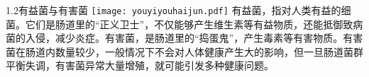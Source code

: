 

\usepackage{graphicx}
\graphicspath{{cores/}}



\vspace*{6mm}
\setlength{\arrayrulewidth}{1pt}
\fontsize{9.3pt}{11pt}\selectfont
\color{gray2}

\begin{spacing}{1.5}
\begin{LRaside}[.8]{1.2有益菌与有害菌}
\noindent
\texttt{[image: youyiyouhaijun.pdf]}
\asidebreak %
有益菌，指对人类有益的细菌。它们是肠道里的“正义卫士”，不仅能够产生维生素等有益物质，还能抵御致病菌的入侵，减少炎症。有害菌，是肠道里的“捣蛋鬼”，产生毒素等有害物质。有害菌在肠道内数量较少，一般情况下不会对人体健康产生大的影响，但一旦肠道菌群平衡失调，有害菌异常大量增殖，就可能引发多种健康问题。
\end{LRaside}
\end{spacing}

\vspace*{5mm}

